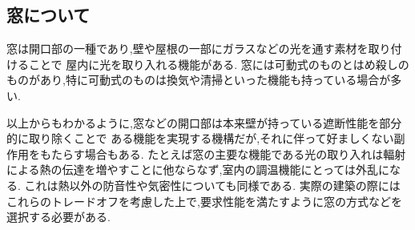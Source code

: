 \subsection*{窓について}
窓は開口部の一種であり,壁や屋根の一部にガラスなどの光を通す素材を取り付けることで
屋内に光を取り入れる機能がある.
窓には可動式のものとはめ殺しのものがあり,特に可動式のものは換気や清掃といった機能も持っている場合が多い.

以上からもわかるように,窓などの開口部は本来壁が持っている遮断性能を部分的に取り除くことで
ある機能を実現する機構だが,それに伴って好ましくない副作用をもたらす場合もある.
たとえば窓の主要な機能である光の取り入れは輻射による熱の伝達を増やすことに他ならなず,室内の調温機能にとっては外乱になる.
これは熱以外の防音性や気密性についても同様である.
実際の建築の際にはこれらのトレードオフを考慮した上で,要求性能を満たすように窓の方式などを選択する必要がある.